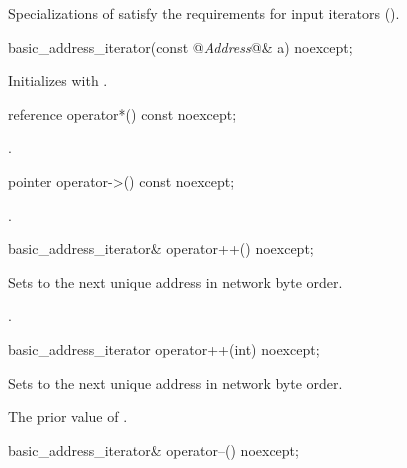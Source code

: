 \pnum
Specializations of  satisfy the requirements for input iterators ().

\begin{itemdecl}
basic_address_iterator(const @\textit{Address}@& a) noexcept;
\end{itemdecl}

\begin{itemdescr}
\pnum
\effects Initializes  with .
\end{itemdescr}

\begin{itemdecl}
reference operator*() const noexcept;
\end{itemdecl}

\begin{itemdescr}
\pnum
\returns {}.
\end{itemdescr}

\begin{itemdecl}
pointer operator->() const noexcept;
\end{itemdecl}

\begin{itemdescr}
\pnum
\returns {}.
\end{itemdescr}

\begin{itemdecl}
basic_address_iterator& operator++() noexcept;
\end{itemdecl}

\begin{itemdescr}
\pnum
\effects Sets  to the next unique address in network byte order.

\pnum
\returns {}.
\end{itemdescr}

\begin{itemdecl}
basic_address_iterator operator++(int) noexcept;
\end{itemdecl}

\begin{itemdescr}
\pnum
\effects Sets  to the next unique address in network byte order.

\pnum
\returns The prior value of .
\end{itemdescr}

\begin{itemdecl}
basic_address_iterator& operator--() noexcept;
\end{itemdecl}

